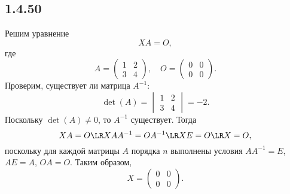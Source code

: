 \subsection{1.4.50}

Решим уравнение
\[
XA=O,
\]
где
\[
A=
\begin{pmatrix}
	1 & 2 \\
	3 & 4
\end{pmatrix}
,\quad O=
\begin{pmatrix}
	0 & 0 \\
	0 & 0
\end{pmatrix}.
\]
Проверим, существует ли матрица $A^{-1}$:
\[
\det(A)=
\begin{vmatrix}
	1 & 2 \\
	3 & 4
\end{vmatrix}
=-2.
\]
Поскольку $\det(A)\neq0$, то $A^{-1}$ существует. Тогда
\[
XA=O\LR XAA^{-1}=OA^{-1}\LR XE=O\LR X=O,
\]
поскольку для каждой матрицы $A$ порядка $n$ выполнены условия $AA^{-1}=E$, $AE=A$, $OA=O$. Таким образом,
\[
X=
\begin{pmatrix}
	0 & 0 \\
	0 & 0
\end{pmatrix}.
\]